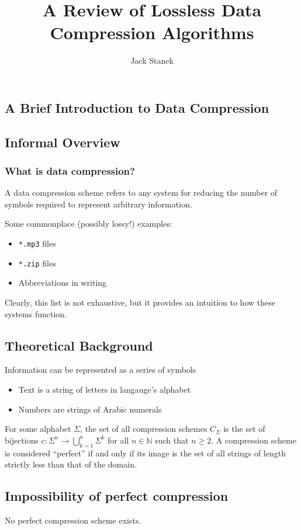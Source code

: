 \documentclass[mathserif,notheorems]{beamer} %
\title{A Review of Lossless Data Compression Algorithms}
\author{Jack Stanek}
\begin{document}
\begin{frame}
  \titlepage
\end{frame}

\begin{frame}
  \tableofcontents
\end{frame}

\begin{frame}
  \section{A Brief Introduction to Data Compression}
  \subsection{Informal Overview}
  \frametitle{What is data compression?}

  A data compression scheme refers to any system for reducing the
  number of symbols required to represent arbitrary information.

  Some commonplace (possibly lossy!) examples:

  \begin{itemize}
    \item \texttt{*.mp3} files
    \item \texttt{*.zip} files
    \item Abbreviations in writing
  \end{itemize}

  Clearly, this list is not exhaustive, but it provides an intuition
  to how these systems function.
\end{frame}

\begin{frame}
  \subsection{Theoretical Background}
  Information can be represented as a series of symbols
  \begin{itemize}
    \item Text is a string of letters in langauge's alphabet
    \item Numbers are strings of Arabic numerals
  \end{itemize}
  For some alphabet $\Sigma$, the set of all compression schemes
  $C_\Sigma$ is the set of bijections
  $c : \Sigma^n \to \bigcup_{k = 1}^{n} \Sigma^k$ for all
  $n \in \mathbb{N}$ such that $n \geq 2$. A compression scheme is
  considered ``perfect'' if and only if its image is the set of all
  strings of length strictly less than that of the domain.
\end{frame}

\begin{frame}
  \subsection{Impossibility of perfect compression}
  \begin{Theorem}
    No perfect compression scheme exists.
  \end{Theorem}
\end{frame}

\begin{frame}

\end{frame}
\end{document}
